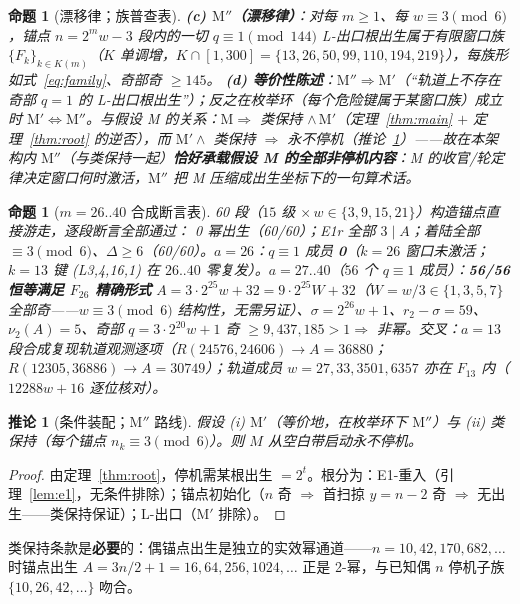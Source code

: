 \documentclass[11pt]{ctexart}
\newtheorem{proposition}[theorem]{命题}
\newtheorem{corollary}[theorem]{推论}
\theoremstyle{definition}
\newcommand{\vtwo}[1]{\nu_2(#1)}
\begin{document}
\begin{proposition}[漂移律；族普查表]
\textbf{(c) $\mathrm{M''}$（漂移律）}：对每 $m\ge1$、每 $w\equiv3\pmod6$，锚点 $n=2^{m}w-3$ 段内的一切 $q\equiv1\pmod{144}$ L-出口根出生属于有限窗口族 $\{F_k\}_{k\in K(m)}$（$K$ 单调增，$K\cap[1,300]=\{13,26,50,99,110,194,219\}$），每族形如式~\eqref{eq:family}、奇部奇 $\ge145$。
\textbf{(d) 等价性陈述}：$\mathrm{M''}\Rightarrow\mathrm{M'}$（``轨道上不存在奇部 $q=1$ 的 L-出口根出生''）；反之在枚举环（每个危险键属于某窗口族）成立时 $\mathrm{M'}\Leftrightarrow\mathrm{M''}$。与假设 M 的关系：$\mathrm{M}\Rightarrow$ 类保持 $\wedge\,\mathrm{M'}$（定理~\ref{thm:main} $+$ 定理~\ref{thm:root} 的逆否），而 $\mathrm{M'}\wedge$ 类保持 $\Rightarrow$ 永不停机（推论~\ref{cor:assembly2}）——故在本架构内 $\mathrm{M''}$（与类保持一起）\textbf{恰好承载假设 M 的全部非停机内容}：M 的收官/轮定律决定窗口何时激活，$\mathrm{M''}$ 把 M 压缩成出生坐标下的一句算术话。
\end{proposition}

\begin{proposition}[$m=26..40$ 合成断言表]\label{prop:m2640}
60 段（$15$ 级 $\times\,w\in\{3,9,15,21\}$）构造锚点直接游走，逐段断言全部通过：
0 幂出生（60/60）；E1r 全部 $3\mid A$；着陆全部 $\equiv3\pmod6$、$\Delta\ge6$（60/60）。$a=26$：$q\equiv1$ 成员 \textbf{0}（$k{=}26$ 窗口未激活；$k{=}13$ 键 (L3,4,16,1) 在 $26..40$ 零复发）。$a=27..40$（$56$ 个 $q\equiv1$ 成员）：\textbf{56/56 恒等满足 $F_{26}$ 精确形式} $A=3\cdot2^{25}w+32=9\cdot2^{25}W+32$（$W=w/3\in\{1,3,5,7\}$ 全部奇——$w\equiv3\pmod6$ 结构性，无需另证）、$\sigma=2^{26}w+1$、$r_2-\sigma=59$、$\vtwo{A}=5$、奇部 $q=3\cdot2^{20}w+1$ 奇 $\ge9{,}437{,}185>1\Rightarrow$ 非幂。交叉：$a=13$ 段合成复现轨道观测逐项（$R(24576,24606)\to A=36880$；$R(12305,36886)\to A=30749$）；轨道成员 $w=27,33,3501,6357$ 亦在 $F_{13}$ 内（$12288w+16$ 逐位核对）。
\end{proposition}

\begin{corollary}[条件装配；$\mathrm{M''}$ 路线]\label{cor:assembly2}
假设 (i) $\mathrm{M'}$（等价地，在枚举环下 $\mathrm{M''}$）与 (ii) 类保持（每个锚点 $n_k\equiv3\pmod6$）。则 $M$ 从空白带启动永不停机。
\end{corollary}
\begin{proof}
由定理~\ref{thm:root}，停机需某根出生 $=2^{t}$。根分为：E1-重入（引理~\ref{lem:e1}，无条件排除）；锚点初始化（$n$ 奇 $\Rightarrow$ 首扫掠 $y=n-2$ 奇 $\Rightarrow$ 无出生——类保持保证）；L-出口（$\mathrm{M'}$ 排除）。
\end{proof}
类保持条款是\textbf{必要}的：偶锚点出生是独立的实效幂通道——$n=10,42,170,682,\dots$ 时锚点出生 $A=3n/2+1=16,64,256,1024,\dots$ 正是 2-幂，与已知偶 $n$ 停机子族 $\{10,26,42,\dots\}$ 吻合。
\end{document}
